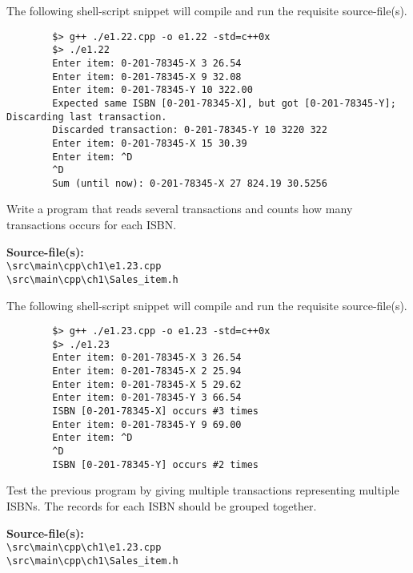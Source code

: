 \documentclass[12pt, a4paper]{article}
\begin{document}
    \noindent The following shell-script snippet will compile and run the requisite source-file(s).
    \begin{verbatim}
        $> g++ ./e1.22.cpp -o e1.22 -std=c++0x
        $> ./e1.22
        Enter item: 0-201-78345-X 3 26.54
        Enter item: 0-201-78345-X 9 32.08
        Enter item: 0-201-78345-Y 10 322.00
        Expected same ISBN [0-201-78345-X], but got [0-201-78345-Y]; Discarding last transaction.
        Discarded transaction: 0-201-78345-Y 10 3220 322
        Enter item: 0-201-78345-X 15 30.39
        Enter item: ^D
        ^D
        Sum (until now): 0-201-78345-X 27 824.19 30.5256
    \end{verbatim}

    \bigskip
    \begin{tcolorbox}[title={Exercise: 1.23}]
        Write a program that reads several transactions and counts how many transactions occurs for each ISBN.
    \end{tcolorbox}
    \noindent\textbf{Source-file(s):}
    \\ \texttt{\textbackslash src\textbackslash main\textbackslash cpp\textbackslash ch1\textbackslash e1.23.cpp}
    \\ \texttt{\textbackslash src\textbackslash main\textbackslash cpp\textbackslash ch1\textbackslash Sales\_item.h}

    \noindent The following shell-script snippet will compile and run the requisite source-file(s).
    \begin{verbatim}
        $> g++ ./e1.23.cpp -o e1.23 -std=c++0x
        $> ./e1.23
        Enter item: 0-201-78345-X 3 26.54
        Enter item: 0-201-78345-X 2 25.94
        Enter item: 0-201-78345-X 5 29.62
        Enter item: 0-201-78345-Y 3 66.54
        ISBN [0-201-78345-X] occurs #3 times
        Enter item: 0-201-78345-Y 9 69.00
        Enter item: ^D
        ^D
        ISBN [0-201-78345-Y] occurs #2 times
    \end{verbatim}

    \bigskip
    \begin{tcolorbox}[title={Exercise: 1.24}]
        Test the previous program by giving multiple transactions representing multiple ISBNs.
        The records for each ISBN should be grouped together.
    \end{tcolorbox}
    \noindent\textbf{Source-file(s):}
    \\ \texttt{\textbackslash src\textbackslash main\textbackslash cpp\textbackslash ch1\textbackslash e1.23.cpp}
    \\ \texttt{\textbackslash src\textbackslash main\textbackslash cpp\textbackslash ch1\textbackslash Sales\_item.h}
\end{document}

